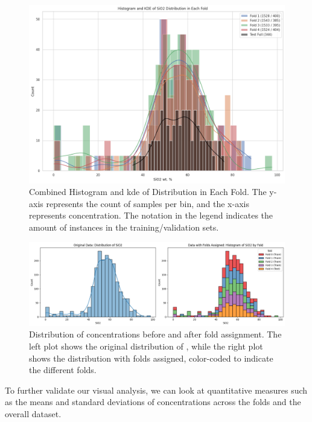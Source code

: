 \begin{figure}[h!]
    \centering
    \includegraphics[width=\textwidth]{images/histogram_kde_plot.png}
    \caption{Combined Histogram and \gls{kde} of  Distribution in Each Fold. The y-axis represents the count of samples per bin, and the x-axis represents  concentration. The notation in the legend indicates the amount of instances in the training/validation sets.}
    \label{fig:histogram_kde_plot}
\end{figure}

\begin{figure}[h!]
    \centering
    \includegraphics[width=\textwidth]{images/original_and_post_fold.png}
    \caption{Distribution of  concentrations before and after fold assignment. The left plot shows the original distribution of , while the right plot shows the distribution with folds assigned, color-coded to indicate the different folds.}
    \label{fig:original_and_post_fold_plot}
\end{figure}


To further validate our visual analysis, we can look at quantitative measures such as the means and standard deviations of  concentrations across the folds and the overall dataset.

